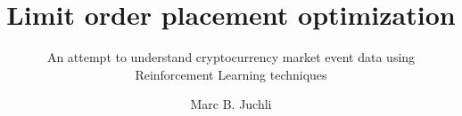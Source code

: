 \documentclass[whitelogo]{tudelft-report}
\begin{document}
\frontmatter


\title[tudelft-white]{Limit order placement optimization}
\subtitle[tudelft-black]{An attempt to understand cryptocurrency market event data using Reinforcement Learning techniques}
\author[tudelft-white]{Marc B. Juchli}
\makecover[split]






\tableofcontents

\mainmatter









\appendix

%


\end{document}
